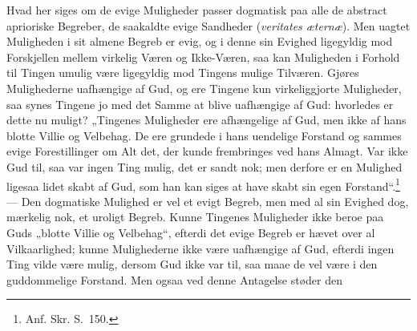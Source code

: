 \documentclass[12pt]{book}
\begin{document}
Hvad her siges om de evige Muligheder passer dogmatisk paa alle de abstract aprioriske Begreber, de saakaldte evige Sandheder (\textit{veritates æternæ}). Men uagtet Muligheden i sit almene Begreb er evig, og i denne sin Evighed ligegyldig mod Forskjellen mellem virkelig Væren og Ikke-Væren, saa kan Muligheden i Forhold til Tingen umulig være ligegyldig mod Tingens mulige Tilværen. %
Gjøres Mulighederne uafhængige af Gud, og ere Tingene kun virkeliggjorte Muligheder, saa synes Tingene jo med det Samme at blive uafhængige af Gud: hvorledes er dette nu muligt? „Tingenes Muligheder ere afhængelige af Gud, men ikke af hans blotte Villie og Velbehag. De ere grundede i hans uendelige Forstand og sammes evige Forestillinger om Alt det, der kunde frembringes ved hans Almagt. Var ikke Gud til, saa var ingen Ting mulig, det er sandt nok; men derfore er en Mulighed ligesaa lidet skabt af Gud, som han kan siges at have skabt sin egen Forstand“.\footnote{Anf. Skr. S.~150.}%
{} --- Den dogmatiske Mulighed er vel et evigt Begreb, men med al sin Evighed dog, mærkelig nok, et uroligt Begreb. Kunne Tingenes Muligheder ikke beroe paa Guds „blotte Villie og Velbehag“, efterdi det evige Begreb er hævet over al Vilkaarlighed; kunne Mulighederne ikke være uafhængige af Gud, efterdi ingen Ting vilde være mulig, dersom Gud ikke var til, saa maae de vel være i den guddommelige Forstand. Men ogsaa ved denne Antagelse støder den
\end{document}
